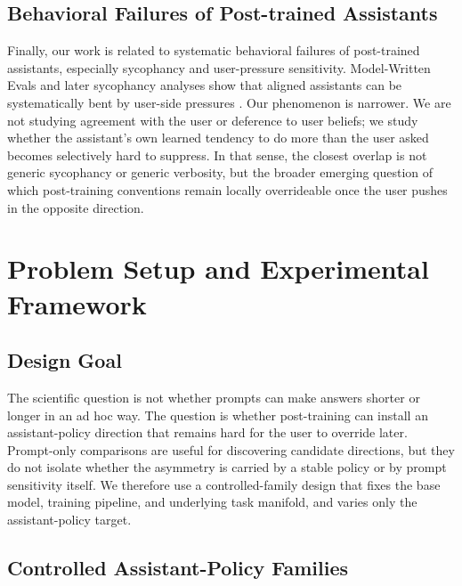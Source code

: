 \documentclass[11pt]{article}
\begin{document}
\subsection{Behavioral Failures of Post-trained Assistants}

Finally, our work is related to systematic behavioral failures of post-trained assistants, especially sycophancy and user-pressure sensitivity. Model-Written Evals and later sycophancy analyses show that aligned assistants can be systematically bent by user-side pressures \citep{perez2022mwe,sharma2023sycophancy}. Our phenomenon is narrower. We are not studying agreement with the user or deference to user beliefs; we study whether the assistant's own learned tendency to do more than the user asked becomes selectively hard to suppress. In that sense, the closest overlap is not generic sycophancy or generic verbosity, but the broader emerging question of which post-training conventions remain locally overrideable once the user pushes in the opposite direction.

\section{Problem Setup and Experimental Framework}
\label{sec:setup}

\subsection{Design Goal}

The scientific question is not whether prompts can make answers shorter or longer in an ad hoc way. The question is whether post-training can install an assistant-policy direction that remains hard for the user to override later. Prompt-only comparisons are useful for discovering candidate directions, but they do not isolate whether the asymmetry is carried by a stable policy or by prompt sensitivity itself. We therefore use a controlled-family design that fixes the base model, training pipeline, and underlying task manifold, and varies only the assistant-policy target.

\subsection{Controlled Assistant-Policy Families}
\end{document}

